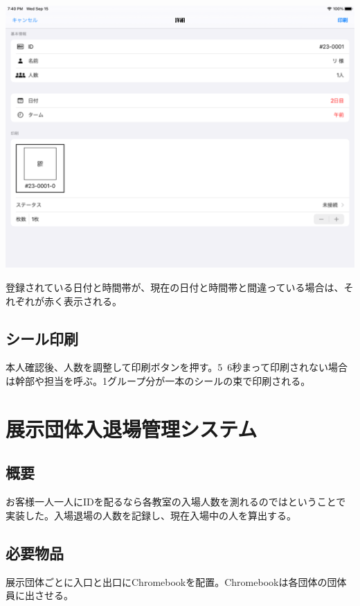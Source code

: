 \documentclass[a4paper]{ltjsreport}
\begin{document}
\begin{enumerate}
        \includegraphics[scale=0.2]{assets/entrance-system.png}
\end{enumerate}
登録されている日付と時間帯が、現在の日付と時間帯と間違っている場合は、それぞれが赤く表示される。
\subsection{シール印刷}
本人確認後、人数を調整して印刷ボタンを押す。5~6秒まって印刷されない場合は幹部や担当を呼ぶ。1グループ分が一本のシールの束で印刷される。
\section{展示団体入退場管理システム}
\subsection{概要}
お客様一人一人にIDを配るなら各教室の入場人数を測れるのではということで実装した。入場退場の人数を記録し、現在入場中の人を算出する。
\subsection{必要物品}
展示団体ごとに入口と出口にChromebookを配置。Chromebookは各団体の団体員に出させる。
\end{document}
